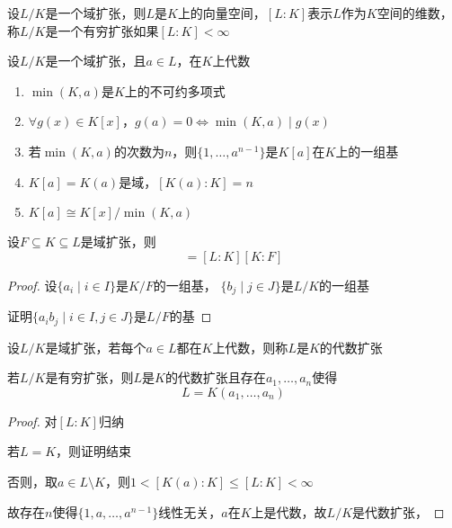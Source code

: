 \documentclass[11pt]{article}
\begin{document}
\begin{definition}[]
设\(L/K\)是一个域扩张，则\(L\)是\(K\)上的向量空间，\([L:K]\)表示\(L\)作为\(K\)空间的维数，
称\(L/K\)是一个有穷扩张如果\([L:K]<\infty\)
\end{definition}

\begin{proposition}[]
设\(L/K\)是一个域扩张，且\(a\in L\)，在\(K\)上代数
\begin{enumerate}
\item \(\min(K,a)\)是\(K\)上的不可约多项式
\item \(\forall g(x)\in K[x]\)，\(g(a)=0\Leftrightarrow\min(K,a)\mid g(x)\)
\item 若\(\min(K,a)\)的次数为\(n\)，则\(\{1,\dots,a^{n-1}\}\)是\(K[a]\)在\(K\)上的一组基
\item \(K[a]=K(a)\)是域，\([K(a):K]=n\)
\item \(K[a]\cong K[x]/\min(K,a)\)
\end{enumerate}
\end{proposition}

\begin{proposition}[]
设\(F\subseteq K\subseteq L\)是域扩张，则
\begin{equation*}
[L:F]=[L:K][K:F]
\end{equation*}
\end{proposition}

\begin{proof}
设\(\{a_i\mid i\in I\}\)是\(K/F\)的一组基， \(\{b_j\mid j\in J\}\)是\(L/K\)的一组基

证明\(\{a_ib_j\mid i\in I,j\in J\}\)是\(L/F\)的基
\end{proof}

\begin{definition}[]
设\(L/K\)是域扩张，若每个\(a\in L\)都在\(K\)上代数，则称\(L\)是\(K\)的代数扩张
\end{definition}

\begin{lemma}[]
若\(L/K\)是有穷扩张，则\(L\)是\(K\)的代数扩张且存在\(a_1,\dots,a_n\)使得
\begin{equation*}
L=K(a_1,\dots,a_n)
\end{equation*}
\end{lemma}

\begin{proof}
对\([L:K]\)归纳

若\(L=K\)，则证明结束

否则，取\(a\in L\setminus K\)，则\(1<[K(a):K]\le[L:K]<\infty\)

故存在\(n\)使得\(\{1,a,\dots,a^{n-1}\}\)线性无关，\(a\)在\(K\)上是代数，故\(L/K\)是代数扩张，
\end{proof}
\end{document}
